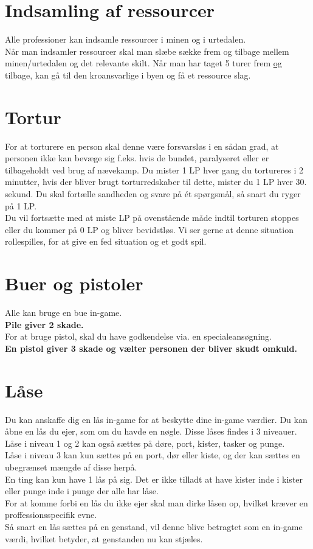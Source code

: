 \section{Indsamling af ressourcer}
Alle professioner kan indsamle ressourcer i minen og i urtedalen. \\
Når man indsamler ressourcer skal man slæbe sække frem og tilbage mellem minen/urtedalen og det relevante skilt. Når man har taget 5 turer frem \underline{og} tilbage, kan gå til den kroansvarlige i byen og få et ressource slag.

\section{Tortur}
For at torturere en person skal denne være forsvarsløs i en sådan grad, at personen ikke kan bevæge sig f.eks. hvis de bundet, paralyseret eller er tilbageholdt ved brug af nævekamp.
Du mister 1 LP hver gang du tortureres i 2 minutter, hvis der bliver brugt torturredskaber til dette, mister du 1 LP hver 30. sekund.
Du skal fortælle sandheden og svare på ét spørgsmål, så snart du ryger på 1 LP.\\
Du vil fortsætte med at miste LP på ovenstående måde indtil torturen stoppes eller du kommer på 0 LP og bliver bevidstløs. Vi ser gerne at denne situation rollespilles, for at give en fed situation og et godt spil.

\section{Buer og pistoler}
Alle kan bruge en bue in-game.\\
\textbf{Pile giver 2 skade.}\\
For at bruge pistol, skal du have godkendelse via. en specialeansøgning.\\ 
\textbf{En pistol giver 3 skade og vælter personen der bliver skudt omkuld.}

\section{Låse}
Du kan anskaffe dig en lås in-game for at beskytte dine in-game værdier. Du kan åbne en lås du ejer, som om du havde en nøgle. Disse låses findes i 3 niveauer.\\
Låse i niveau 1 og 2 kan også sættes på døre, port, kister, tasker og punge.\\
Låse i niveau 3 kan kun sættes på en port, dør eller kiste, og der kan sættes en ubegrænset mængde af disse herpå.\\
En ting kan kun have 1 lås på sig. Det er ikke tilladt at have kister inde i kister eller punge inde i punge der alle har låse.\\
For at komme forbi en lås du ikke ejer skal man dirke låsen op, hvilket kræver en proffessionsspecifik evne.\\
Så snart en lås sættes på en genstand, vil denne blive betragtet som en in-game værdi, hvilket betyder, at genstanden nu kan stjæles.

